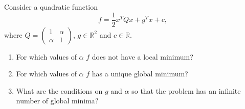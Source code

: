 
Consider a quadratic function $$f=\frac{1}{2}x^TQx+g^Tx+c,$$
where $Q = \begin{pmatrix}
1 & \alpha\\ \alpha & 1
\end{pmatrix}$, $g\in \mathbb{R}^2$ and $c \in \mathbb{R}$.
\begin{enumerate}
\item For which values of $\alpha$ $f$ does not have a local minimum?
\item For which values of $\alpha$ $f$ has a unique global minimum?
\item What are the conditions on $g$ and $\alpha$ so that the problem has an infinite number of global minima?
\end{enumerate}


